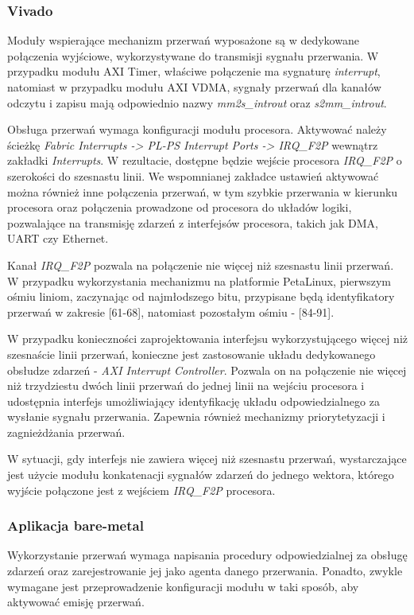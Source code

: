 \subsubsection{Vivado}
Moduły wspierające mechanizm przerwań wyposażone są w dedykowane połączenia wyjściowe, wykorzystywane do transmisji sygnału przerwania. W przypadku modułu AXI Timer, właściwe połączenie ma sygnaturę \emph{interrupt}, natomiast w przypadku modułu AXI VDMA, sygnały przerwań dla kanałów odczytu i zapisu mają odpowiednio nazwy \emph{mm2s\_introut} oraz \emph{s2mm\_introut}.

Obsługa przerwań wymaga konfiguracji modułu procesora. Aktywować należy ścieżkę \emph{Fabric Interrupts -> PL-PS Interrupt Ports -> IRQ\_F2P} wewnątrz zakładki \emph{Interrupts}. W rezultacie, dostępne będzie wejście procesora \emph{IRQ\_F2P} o szerokości do szesnastu linii. We wspomnianej zakładce ustawień aktywować można również inne połączenia przerwań, w tym szybkie przerwania w kierunku procesora oraz połączenia prowadzone od procesora do układów logiki, pozwalające na transmisję zdarzeń z interfejsów procesora, takich jak DMA, UART czy Ethernet.

Kanał \emph{IRQ\_F2P} pozwala na połączenie nie więcej niż szesnastu linii przerwań. W przypadku wykorzystania mechanizmu na platformie PetaLinux, pierwszym ośmiu liniom, zaczynając od najmłodszego bitu, przypisane będą identyfikatory przerwań w zakresie [61-68], natomiast pozostałym ośmiu - [84-91].

W przypadku konieczności zaprojektowania interfejsu wykorzystującego więcej niż szesnaście linii przerwań, konieczne jest zastosowanie układu dedykowanego obsłudze zdarzeń - \emph{AXI Interrupt Controller}. Pozwala on na połączenie nie więcej niż trzydziestu dwóch linii przerwań do jednej linii na wejściu procesora i udostępnia interfejs umożliwiający identyfikację układu odpowiedzialnego za wysłanie sygnału przerwania. Zapewnia również mechanizmy priorytetyzacji i zagnieżdżania przerwań.

W sytuacji, gdy interfejs nie zawiera więcej niż szesnastu przerwań, wystarczające jest użycie modułu konkatenacji sygnałów zdarzeń do jednego wektora, którego wyjście połączone jest z wejściem \emph{IRQ\_F2P} procesora.

\subsubsection{Aplikacja bare-metal}
Wykorzystanie przerwań wymaga napisania procedury odpowiedzialnej za obsługę zdarzeń oraz zarejestrowanie jej jako agenta danego przerwania. Ponadto, zwykle wymagane jest przeprowadzenie konfiguracji modułu w taki sposób, aby aktywować emisję przerwań.

